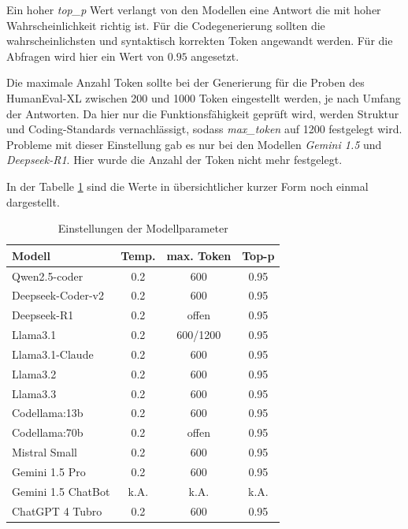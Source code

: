 Ein hoher \textit{top\_p} Wert verlangt von den Modellen eine Antwort die mit hoher Wahrscheinlichkeit richtig ist. Für die Codegenerierung sollten die wahrscheinlichsten und syntaktisch korrekten Token angewandt werden. Für die Abfragen wird hier ein Wert von $0.95$ angesetzt.\vspace{0.2cm}

Die maximale Anzahl Token sollte bei der Generierung für die Proben des HumanEval-XL zwischen 200 und 1000 Token eingestellt werden, je nach Umfang der Antworten. Da hier nur die Funktionsfähigkeit geprüft wird, werden Struktur und Coding-Standards vernachlässigt, sodass \textit{max\_token} auf 1200 festgelegt wird. Probleme mit dieser Einstellung gab es nur bei den Modellen \textit{Gemini 1.5} und \textit{Deepseek-R1}. Hier wurde die Anzahl der Token nicht mehr festgelegt.\vspace{0.2cm}

In der Tabelle \ref{tab:params_for_llms} sind die Werte in übersichtlicher kurzer Form noch einmal dargestellt.

\begin{table}[!ht]
	\begin{tabular}{|l|c|c|c|}
		\hline
		\textbf{Modell} & \textbf{Temp.} & \textbf{max. Token} & \textbf{Top-p} \\
		\hline
		Qwen2.5-coder      &  0.2 &       600 & 0.95 \\
		Deepseek-Coder-v2  &  0.2 &       600 & 0.95 \\
		Deepseek-R1        &  0.2 &     offen & 0.95 \\
		Llama3.1           &  0.2 &  600/1200 & 0.95 \\
		Llama3.1-Claude    &  0.2 &       600 & 0.95 \\
		Llama3.2           &  0.2 &       600 & 0.95 \\
		Llama3.3           &  0.2 &       600 & 0.95 \\
		Codellama:13b      &  0.2 &       600 & 0.95 \\
		Codellama:70b      &  0.2 &     offen & 0.95 \\
		Mistral Small      &  0.2 &       600 & 0.95 \\
		Gemini 1.5 Pro     &  0.2 &       600 & 0.95 \\
		Gemini 1.5 ChatBot & k.A. &      k.A. & k.A. \\
		ChatGPT 4 Tubro    &  0.2 &       600 & 0.95 \\
		\hline
		\hline
	\end{tabular}
	\centering
	\caption{Einstellungen der Modellparameter}
	\label{tab:params_for_llms}
\end{table}

